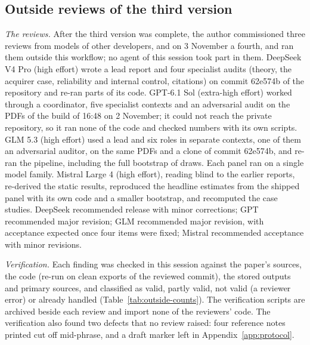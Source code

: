 \subsection{Outside reviews of the third version}\label{supp:protocol-outside}
\emph{The reviews.} After the third version was complete, the author commissioned three reviews from models of other developers, and on 3 November a fourth, and ran them outside this workflow; no agent of this session took part in them. DeepSeek V4 Pro (high effort) wrote a lead report and four specialist audits (theory, the acquirer case, reliability and internal control, citations) on commit 62e574b of the repository and re-ran parts of its code. GPT-6.1 Sol (extra-high effort) worked through a coordinator, five specialist contexts and an adversarial audit on the PDFs of the build of 16:48 on 2 November; it could not reach the private repository, so it ran none of the code and checked numbers with its own scripts. GLM 5.3 (high effort) used a lead and six roles in separate contexts, one of them an adversarial auditor, on the same PDFs and a clone of commit 62e574b, and re-ran the pipeline, including the full bootstrap of \BootB{} draws. Each panel ran on a single model family. Mistral Large 4 (high effort), reading blind to the earlier reports, re-derived the static results, reproduced the headline estimates from the shipped panel with its own code and a smaller bootstrap, and recomputed the case studies. DeepSeek recommended release with minor corrections; GPT recommended major revision; GLM recommended major revision, with acceptance expected once four items were fixed; Mistral recommended acceptance with minor revisions.

\emph{Verification.} Each finding was checked in this session against the paper's sources, the code (re-run on clean exports of the reviewed commit), the stored outputs and primary sources, and classified as valid, partly valid, not valid (a reviewer error) or already handled (Table~\ref{tab:outside-counts}). The verification scripts are archived beside each review and import none of the reviewers' code. The verification also found two defects that no review raised: four reference notes printed cut off mid-phrase, and a draft marker left in Appendix~\ref{app:protocol}.

